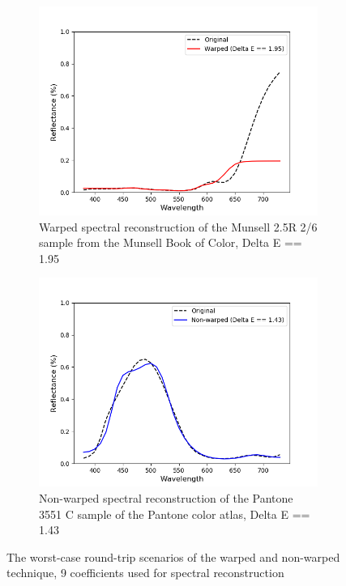 \begin{figure}[t]
	\centering
	\vspace{1em}
	\begin{subfigure}[t]{0.49\textwidth}
		\includegraphics[width=\linewidth]{img/results_worstWarped.png}
		\caption{Warped spectral reconstruction of the Munsell 2.5R 2/6 sample from the Munsell Book of Color, Delta E == 1.95}
		\label{fig:resultWorstWarp}
	\end{subfigure} \hspace{0.1em}
	\begin{subfigure}[t]{0.49\textwidth}
		\includegraphics[width=\linewidth]{img/results_worstNonWarped.png}
		\caption{Non-warped spectral reconstruction of the Pantone 3551 C sample of the Pantone color atlas, Delta E == 1.43}
		\label{fig:resultWorstNonWarp}
	\end{subfigure}
	\caption{The worst-case round-trip scenarios of the warped and non-warped technique, 9 coefficients used for spectral reconstruction}
	\label{fig:resultsTechniquesWorst}
\end{figure}

